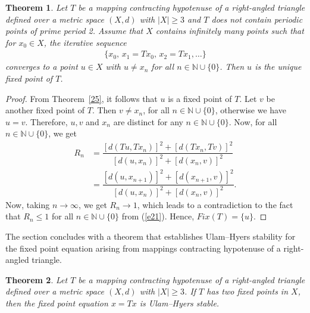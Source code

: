 \documentclass[11pt,reqno,a4paper]{amsart}
\theoremstyle{plain}
\newtheorem{theorem}{Theorem}[section]
\theoremstyle{definition}
\theoremstyle{remark}
\numberwithin{equation}{section}
\begin{document}
\begin{theorem}\label{29}
Let $T$ be a mapping contracting hypotenuse of a right-angled triangle defined over a metric space $(X,d)$ with $|X|\ge 3$ and $T$ does not contain periodic points of prime period 2. Assume that $X$ contains infinitely many points such that for $x_0 \in X$, the iterative sequence 
\begin{align*}
   \{ x_0, \, x_1 = Tx_0, \, x_2 = Tx_1, \dots \}
\end{align*}
converges to a point $u \in X$ with $u \neq x_n$ for all $n \in \mathbb{N} \cup \{0\}$. Then $u$ is the unique fixed point of $T$.
\end{theorem}


\begin{proof}
From Theorem~\ref{25}, it follows that $u$ is a fixed point of $T$. Let $v$ be another fixed point of $T$. Then $v \neq x_n$, for all $n \in \mathbb{N} \cup \{0\}$, otherwise we have $u = v$. Therefore, $u, v$ and $x_n$ are distinct for any $n \in \mathbb{N} \cup \{0\}$. Now, for all $n \in \mathbb{N}\cup \{0\}$, we get
\begin{align*}
R_n&= \dfrac{{[d(Tu, Tx_n)]}^2 + {[d(Tx_n, Tv)]}^2}{{[d(u, x_n)]}^2 + {[d(x_n, v)]}^2}\\
&= \dfrac{{[d(u, x_{n+1})]}^2 + {[d(x_{n+1}, v)]}^2}{{[d(u, x_n)]}^2 + {[d(x_n, v)]}^2}.
\end{align*}
Now, taking $n \to \infty$, we get $R_n \to 1$, which leads to a contradiction to the fact that $R_n\le 1$ for all $n \in \mathbb{N} \cup \{0\}$ from (\ref{e21}). Hence, $Fix(T)= \{u\}$.
\end{proof}
The section concludes with a theorem that establishes Ulam–Hyers stability for the fixed point equation arising from mappings contracting hypotenuse of a right-angled triangle.

\begin{theorem}\label{210}
    Let $T$ be a mapping contracting hypotenuse of a right-angled triangle defined over a metric space $(X,d)$ with $|X| \ge 3$. If $T$ has two fixed points in $X$, then the fixed point equation $x=Tx$ is Ulam--Hyers stable.
\end{theorem}
\end{document}
